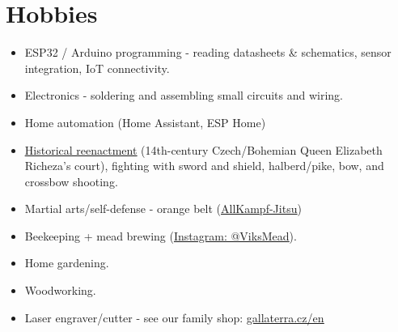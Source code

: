 \documentclass[10pt,a4paper]{article}
\let\plainhref\href
\renewcommand{\href}[2]{\plainhref{#1}{\underline{#2}}}
\begin{document}
\section{Hobbies}
\begin{itemize}
  \item ESP32 / Arduino programming - reading datasheets \& schematics, sensor integration, IoT connectivity.
  \item Electronics - soldering and assembling small circuits and wiring.
  \item Home automation (Home Assistant, ESP Home)
  \item \href{https://hradeckydvur.net/}{Historical reenactment} (14th-century Czech/Bohemian Queen Elizabeth Richeza’s court), fighting with sword and shield, halberd/pike, bow, and crossbow shooting.
  \item Martial arts/self-defense - orange belt (\href{https://allkampf-jitsu.cz/}{AllKampf-Jitsu})
  \item Beekeeping + mead brewing (\href{https://www.instagram.com/viksmead?igsh=MWNyajU5OWJhNDZrOA==}{Instagram: @ViksMead}).
  \item Home gardening.
  \item Woodworking.
  \item Laser engraver/cutter - see our family shop: \href{https://www.gallaterra.cz/en/wooden-decorations-and-accessories}{gallaterra.cz/en}
\end{itemize}
\end{document}
